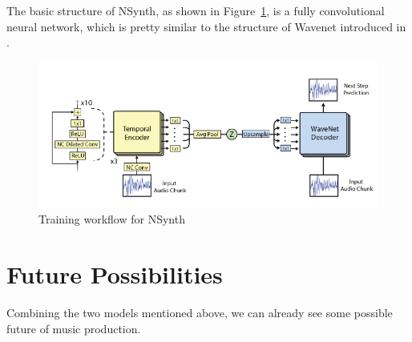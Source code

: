 \documentclass[jou]{apa6}
\begin{document}
The basic structure of NSynth, as shown in Figure~\ref{fig:Figure2}, is a fully convolutional neural network, which is pretty similar to the structure of Wavenet introduced in \textcite{oord2016wavenet}.

\begin{figure}[h!]
    \includegraphics[width=\linewidth]{nsynth.png}
    \caption{Training workflow for NSynth}
    \label{fig:Figure2}
\end{figure}

\section{Future Possibilities}

Combining the two models mentioned above, we can already see some possible future of music production.

\printbibliography
\end{document}
